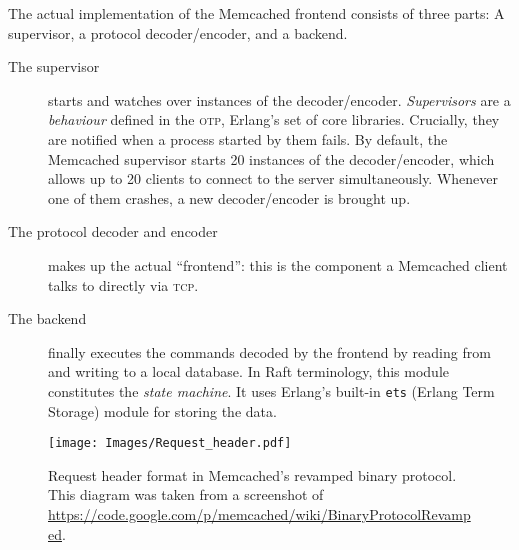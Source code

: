 \documentclass[11pt,chapterprefix=true,toc=bibliography,numbers=noendperiod,
               footnotes=multiple,twoside]{scrreprt}
\begin{document}

The actual implementation of the Memcached frontend consists of three parts: A supervisor, a protocol decoder/encoder, and a backend.

\begin{description}
    \item[The supervisor] starts and watches over instances of the decoder/encoder. \emph{Supervisors} are a \emph{behaviour} defined in the \textsc{otp}, Erlang's set of core libraries. Crucially, they are notified when a process started by them fails. By default, the Memcached supervisor starts 20 instances of the decoder/encoder, which allows up to 20 clients to connect to the server simultaneously. Whenever one of them crashes, a new decoder/encoder is brought up.
    \item[The protocol decoder and encoder] makes up the actual \enquote{frontend}: this is the component a Memcached client talks to directly via \textsc{tcp}.
    \item[The backend] finally executes the commands decoded by the frontend by reading from and writing to a local database. In Raft terminology, this module constitutes the \emph{state machine}. It uses Erlang's built-in \texttt{ets} (Erlang Term Storage) module for storing the data.
\end{description}

\begin{figure}[p]
    \centering
    \texttt{[image: Images/Request\_header.pdf]}
    \caption[Request header format in Memcached's revamped binary protocol]{Request header format in Memcached's revamped binary protocol. This diagram was taken from a screenshot of \url{https://code.google.com/p/memcached/wiki/BinaryProtocolRevamped}.}
    \label{fig:request-header}
\end{figure}
\end{document}
